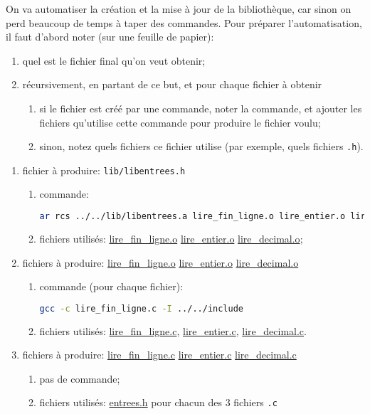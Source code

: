\question On va automatiser la création et la mise à jour de la
bibliothèque, car sinon on perd beaucoup de temps à taper des
commandes. Pour préparer l'automatisation, il faut d'abord noter (sur
une feuille de papier):
\begin{enumerate}
\item quel est le fichier final qu'on veut obtenir;
\item récursivement, en partant de ce but, et pour chaque fichier à obtenir
  \begin{enumerate}
  \item si le fichier est créé par une commande, noter la commande, et
    ajouter les fichiers qu'utilise cette commande pour produire le
    fichier voulu;
  \item sinon, notez quels fichiers ce fichier utilise (par exemple,
    quels fichiers \texttt{.h}).
  \end{enumerate}
\end{enumerate}

\begin{solutioncachee}
  \begin{enumerate}
  \item fichier à produire: \texttt{lib/libentrees.h}
    \begin{enumerate}
    \item commande:
      \begin{lstlisting}[language=bash]
        ar rcs ../../lib/libentrees.a lire_fin_ligne.o lire_entier.o lire_decimal.o
      \end{lstlisting}
    \item fichiers utilisés: \url{lire_fin_ligne.o}
      \url{lire_entier.o} \url{lire_decimal.o};
    \end{enumerate} 
  \item fichiers à produire: \url{lire_fin_ligne.o} \url{lire_entier.o}
    \url{lire_decimal.o}
    \begin{enumerate}
    \item commande (pour chaque fichier):
      \begin{lstlisting}[language=bash]
        gcc -c lire_fin_ligne.c -I ../../include
      \end{lstlisting}
    \item fichiers utilisés: \url{lire_fin_ligne.c}, \url{lire_entier.c},
      \url{lire_decimal.c}.
    \end{enumerate} 
  \item fichiers à produire: \url{lire_fin_ligne.c} \url{lire_entier.c}
    \url{lire_decimal.c}
    \begin{enumerate}
    \item pas de commande;
    \item fichiers utilisés: \url{entrees.h} pour chacun des 3 fichiers \texttt{.c}
    \end{enumerate} 
  \end{enumerate}
\end{solutioncachee}

